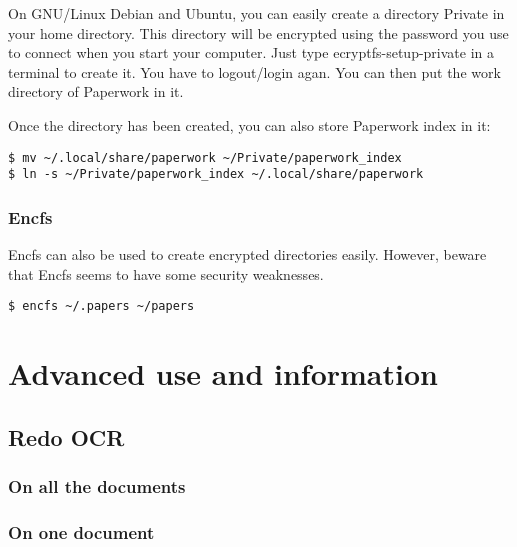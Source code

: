 \documentclass[10pt,a4paper]{article}
\begin{document}
On GNU/Linux Debian and Ubuntu, you can easily create a directory
Private in your home directory. This directory will be encrypted using
the password you use to connect when you start your computer. Just
type ecryptfs-setup-private in a terminal to create it. You have to
logout/login agan. You can then put the work directory of Paperwork
in it.

Once the directory has been created, you can also store Paperwork
index in it:
\begin{verbatim}
$ mv ~/.local/share/paperwork ~/Private/paperwork_index
$ ln -s ~/Private/paperwork_index ~/.local/share/paperwork
\end{verbatim}

\subsubsection{Encfs}

Encfs can also be used to create encrypted directories easily. However,
beware that Encfs seems to have some security weaknesses.
\begin{verbatim}
$ encfs ~/.papers ~/papers
\end{verbatim}

\section{Advanced use and information}

\subsection{Redo OCR}

\subsubsection{On all the documents}



\subsubsection{On one document}
\end{document}
